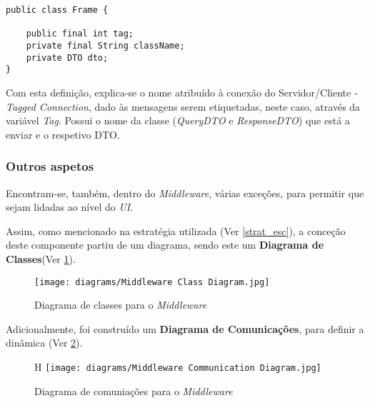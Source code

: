 \documentclass[relatorio.tex]{subfiles}
\begin{document}
\begin{verbatim}
public class Frame {

    public final int tag;
    private final String className;
    private DTO dto;
}
\end{verbatim}

Com esta definição, explica-se o nome atribuído à conexão do Servidor/Cliente - \textit{Tagged Connection}, dado às mensagens serem etiquetadas,
neste caso, através da variável \textit{Tag}.
Possui o nome da classe (\textit{QueryDTO} e \textit{ResponseDTO}) que está a enviar e o respetivo DTO.


\subsubsection{Outros aspetos}

Encontram-se, também, dentro do \textit{Middleware}, várias exceções, para permitir que sejam lidadas ao nível do \textit{UI}.

Assim, como mencionado na estratégia utilizada (Ver \ref{strat_esc}), a conceção deste componente partiu de um diagrama, 
sendo este um \textbf{Diagrama de Classes}(Ver \ref{dig:classes_middle}).

\begin{figure}[H] \label{dig:classes_middle}
    \texttt{[image: diagrams/Middleware Class Diagram.jpg]}
    \caption{Diagrama de classes para o \textit{Middleware}}
\end{figure}

Adicionalmente, foi construído um \textbf{Diagrama de Comunicações}, para definir a dinâmica (Ver \ref{dig:comms_middle}).

\begin{figure}{H} \label{dig:comms_middle}
    \texttt{[image: diagrams/Middleware Communication Diagram.jpg]}
    \caption{Diagrama de comuniações para o \textit{Middleware}}
\end{figure}
\end{document}
